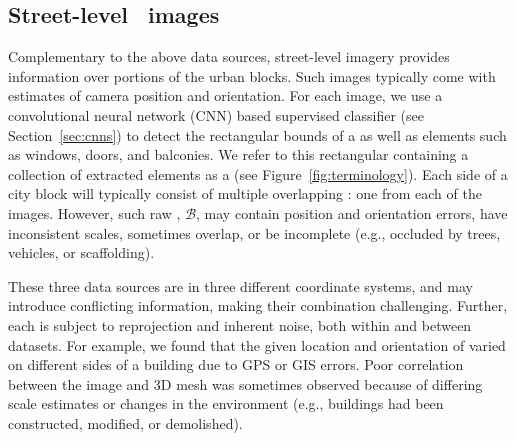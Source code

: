 \subsection{Street-level \facade\  images}  
Complementary to the above data sources, street-level imagery provides  information over portions of the urban blocks. Such images typically come with estimates of camera position and orientation.
For each image, we use a convolutional neural network (CNN) based supervised classifier (see Section~\ref{sec:cnns}) to detect the rectangular bounds of a \facade as well as elements such as windows, doors, and balconies. We refer to this rectangular \facade containing a collection of extracted elements as a \emph{\buildingfacade} (see Figure~\ref{fig:terminology}). Each side of a city block will typically consist of multiple overlapping \buildingfacades: one from each of the images. However, such raw \buildingfacades, $\mathcal{B}$, may contain position and orientation errors, have inconsistent scales, sometimes overlap, or be incomplete (e.g., occluded by trees, vehicles, or scaffolding). 

These three data sources are in three different coordinate systems, and may introduce conflicting information, making their combination challenging.  
Further, each is subject to reprojection and inherent noise, both within and between datasets. For example, we found that the given location and orientation of \buildingfacades varied on different sides of a building due to GPS or GIS errors. Poor correlation between the image and 3D mesh was sometimes observed because of differing scale estimates or changes in the environment (e.g., buildings had been constructed, modified, or demolished). 



